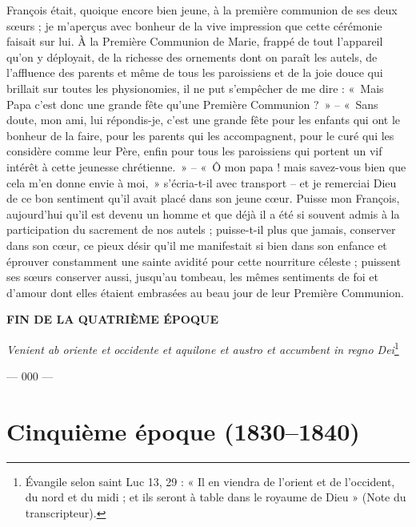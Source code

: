 \documentclass[11pt,a4paper]{report}
\begin{document}
François était, quoique encore bien jeune, à la première communion de ses deux sœurs ; je m'aperçus avec bonheur de la vive impression que cette cérémonie faisait sur lui. À la Première Communion de Marie, frappé de tout l'appareil qu'on y déployait, de la richesse des ornements dont on paraît les autels, de l'affluence des parents et même de tous les paroissiens et de la joie douce qui brillait sur toutes les physionomies, il ne put s'empêcher de me dire : «~Mais Papa c'est donc une grande fête qu'une Première Communion ?~» -- «~Sans doute, mon ami, lui répondis-je, c'est une grande fête pour les enfants qui ont le bonheur de la faire, pour les parents qui les accompagnent, pour le curé qui les considère comme leur Père, enfin pour tous les paroissiens qui portent un vif intérêt à cette jeunesse chrétienne.~» -- «~Ô mon papa ! mais savez-vous bien que cela m'en donne envie à moi,~» s'écria-t-il avec transport -- et je remerciai Dieu de ce bon sentiment qu'il avait placé dans son jeune cœur. Puisse mon François, aujourd'hui qu'il est devenu un homme et que déjà il a été si souvent admis à la participation du sacrement de nos autels ; puisse-t-il plus que jamais, conserver dans son cœur, ce pieux désir qu'il me manifestait si bien dans son enfance et éprouver constamment une sainte avidité pour cette nourriture céleste ; puissent ses sœurs conserver aussi, jusqu'au tombeau, les mêmes sentiments de foi et d'amour dont elles étaient embrasées au beau jour de leur Première Communion.

\vspace{1cm}

\begin{center}
\textbf{FIN DE LA QUATRIÈME ÉPOQUE}

\vspace{0.5cm}

\textit{Venient ab oriente et occidente et aquilone et austro et accumbent in regno Dei}\footnote{Évangile selon saint Luc 13, 29 : « Il en viendra de l'orient et de l'occident, du nord et du midi ; et ils seront à table dans le royaume de Dieu » (Note du transcripteur).}

\vspace{0.5cm}

--- 000 ---
\end{center}


\part*{Cinquième époque (1830--1840)}
\end{document}
